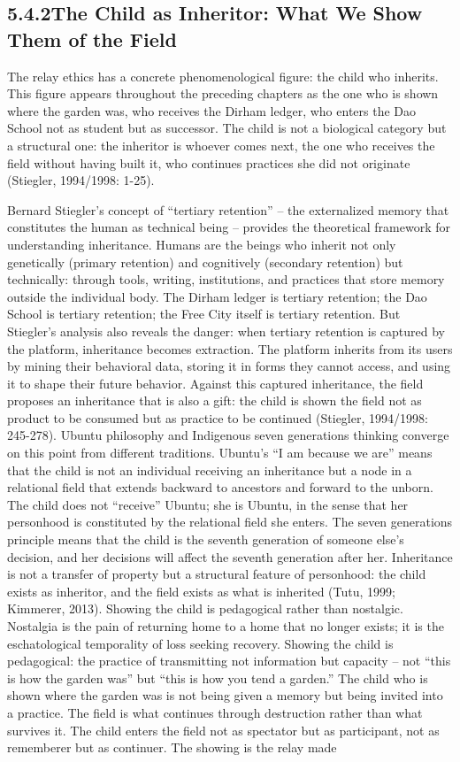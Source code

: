 \subsection{5.4.2\quad The Child as Inheritor: What We Show Them of the Field}

The relay ethics has a concrete phenomenological figure: the child who inherits. This figure appears throughout the preceding chapters as the one who is shown where the garden was, who receives the Dirham ledger, who enters the Dao School not as student but as successor. The child is not a biological category but a structural one: the inheritor is whoever comes next, the one who receives the field without having built it, who continues practices she did not originate (Stiegler, 1994/1998: 1-25).

Bernard Stiegler’s concept of “tertiary retention” – the externalized memory that constitutes the human as technical being – provides the theoretical framework for understanding inheritance. Humans are the beings who inherit not only genetically (primary retention) and cognitively (secondary retention) but technically: through tools, writing, institutions, and practices that store memory outside the individual body. The Dirham ledger is tertiary retention; the Dao School is tertiary retention; the Free City itself is tertiary retention. But Stiegler’s analysis also reveals the danger: when tertiary retention is captured by the platform, inheritance becomes extraction. The platform inherits from its users by mining their behavioral data, storing it in forms they cannot access, and using it to shape their future behavior. Against this captured inheritance, the field proposes an inheritance that is also a gift: the child is shown the field not as product to be consumed but as practice to be continued (Stiegler, 1994/1998: 245-278). Ubuntu philosophy and Indigenous seven generations thinking converge on this point from different traditions. Ubuntu’s “I am because we are” means that the child is not an individual receiving an inheritance but a node in a relational field that extends backward to ancestors and forward to the unborn. The child does not “receive” Ubuntu; she is Ubuntu, in the sense that her personhood is constituted by the relational field she enters. The seven generations principle means that the child is the seventh generation of someone else’s decision, and her decisions will affect the seventh generation after her. Inheritance is not a transfer of property but a structural feature of personhood: the child exists as inheritor, and the field exists as what is inherited (Tutu, 1999; Kimmerer, 2013). Showing the child is pedagogical rather than nostalgic. Nostalgia is the pain of returning home to a home that no longer exists; it is the eschatological temporality of loss seeking recovery. Showing the child is pedagogical: the practice of transmitting not information but capacity – not “this is how the garden was” but “this is how you tend a garden.” The child who is shown where the garden was is not being given a memory but being invited into a practice. The field is what continues through destruction rather than what survives it. The child enters the field not as spectator but as participant, not as rememberer but as continuer. The showing is the relay made 